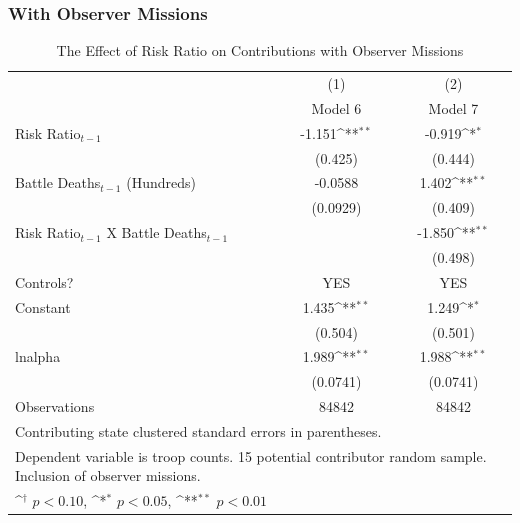 \documentclass{beamer}
\begin{document}

\begin{frame}[fragile]
\frametitle{With Observer Missions}

\begin{table}[htbp]\centering
\tiny
\def\sym#1{\ifmmode^{#1}\else\(^{#1}\)\fi}
\caption{The Effect of Risk Ratio on Contributions with Observer Missions \label{Table 6}}
\vspace{0.4cm}
\begin{tabular}{l*{2}{c}}
\hline\hline
                    &\multicolumn{1}{c}{(1)}        &\multicolumn{1}{c}{(2)}        \\
                    &          Model 6        &          Model 7        \\
\hline
Risk Ratio$_{t-1}$          &      -1.151\sym{**}&      -0.919\sym{*} \\
                    &     (0.425)        &     (0.444)        \\
[1em]
Battle Deaths$_{t-1}$ (Hundreds)&     -0.0588        &       1.402\sym{**}\\
                    &    (0.0929)        &     (0.409)        \\
[1em]
Risk Ratio$_{t-1}$ X Battle Deaths$_{t-1}$ &                    &      -1.850\sym{**}\\
                    &                    &     (0.498)        \\
[1em]
Controls?           &        YES         &         YES        \\
[1em]
Constant            &       1.435\sym{**}&       1.249\sym{*} \\
                    &     (0.504)        &     (0.501)        \\
\hline
lnalpha             &       1.989\sym{**}&       1.988\sym{**}\\
                    &    (0.0741)        &    (0.0741)        \\
\hline
Observations        &       84842        &       84842        \\
\hline\hline
\multicolumn{3}{l}{\tiny Contributing state clustered standard errors in parentheses.}\\
\multicolumn{3}{l}{\tiny Dependent variable is troop counts. 15 potential contributor random sample. Inclusion of observer missions.}\\
\multicolumn{3}{l}{\tiny \sym{\dagger} \(p<0.10\), \sym{*} \(p<0.05\), \sym{**} \(p<0.01\)}\\
\end{tabular}
\end{table}

\end{frame}
\end{document}
